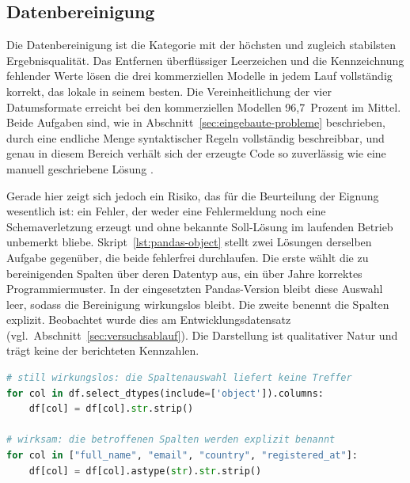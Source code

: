 \subsection{Datenbereinigung}
\label{subsec:ergebnisse-bereinigung}

Die Datenbereinigung ist die Kategorie mit der höchsten und zugleich stabilsten Ergebnisqualität. Das Entfernen überflüssiger Leerzeichen und die Kennzeichnung fehlender Werte lösen die drei kommerziellen Modelle in jedem Lauf vollständig korrekt, das lokale in seinem besten. Die Vereinheitlichung der vier Datumsformate erreicht bei den kommerziellen Modellen 96,7~Prozent im Mittel. Beide Aufgaben sind, wie in Abschnitt~\ref{sec:eingebaute-probleme} beschrieben, durch eine endliche Menge syntaktischer Regeln vollständig beschreibbar, und genau in diesem Bereich verhält sich der erzeugte Code so zuverlässig wie eine manuell geschriebene Lösung \autocite{coteDataCleaningMachine2024,rangineniReviewEnhancingData2023}.

Gerade hier zeigt sich jedoch ein Risiko, das für die Beurteilung der Eignung wesentlich ist: ein Fehler, der weder eine Fehlermeldung noch eine Schemaverletzung erzeugt und ohne bekannte Soll-Lösung im laufenden Betrieb unbemerkt bliebe. Skript~\ref{lst:pandas-object} stellt zwei Lösungen derselben Aufgabe gegenüber, die beide fehlerfrei durchlaufen. Die erste wählt die zu bereinigenden Spalten über deren Datentyp aus, ein über Jahre korrektes Programmiermuster. In der eingesetzten Pandas-Version bleibt diese Auswahl leer, sodass die Bereinigung wirkungslos bleibt. Die zweite benennt die Spalten explizit. Beobachtet wurde dies am Entwicklungsdatensatz (vgl.\ Abschnitt~\ref{sec:versuchsablauf}). Die Darstellung ist qualitativer Natur und trägt keine der berichteten Kennzahlen.

\begin{lstlisting}[language=Python, caption={[Zwei lauffähige Lösungen derselben Bereinigungsaufgabe]{Zwei lauffähige Lösungen derselben Bereinigungsaufgabe: Die obere Variante bleibt in der eingesetzten Pandas-Version wirkungslos, weil Textspalten nicht mehr als Objektspalten geführt werden. Die untere benennt die Spalten explizit.}}, label=lst:pandas-object]
# still wirkungslos: die Spaltenauswahl liefert keine Treffer
for col in df.select_dtypes(include=['object']).columns:
    df[col] = df[col].str.strip()

# wirksam: die betroffenen Spalten werden explizit benannt
for col in ["full_name", "email", "country", "registered_at"]:
    df[col] = df[col].astype(str).str.strip()
\end{lstlisting}

